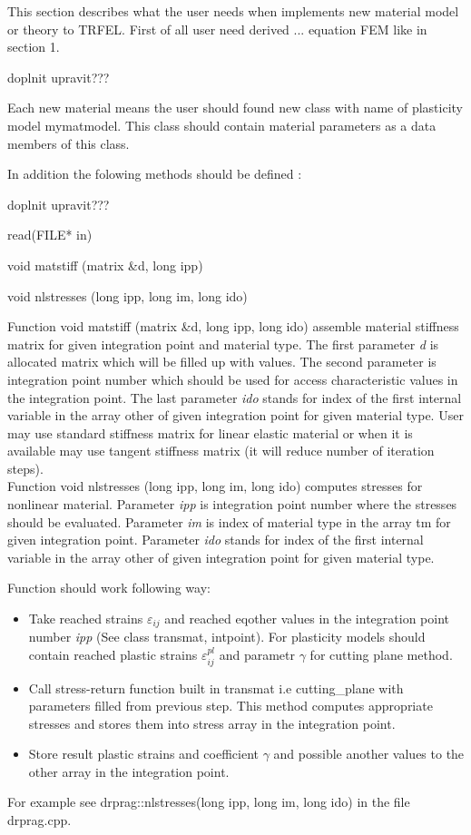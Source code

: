 This section describes what the user needs when implements new material model or theory
to TRFEL. First of all user need derived ... equation FEM like in section 1.

doplnit upravit???


Each new material means the user should found new class with name of plasticity model {\sf mymatmodel}.
This class should contain material parameters as a data members of this class. 

In addition the folowing methods should be defined :

doplnit upravit???

\begin{itemize}
{\sf
\item
read(FILE* in)
\item
void matstiff (matrix \&d, long ipp)
\item
void nlstresses (long ipp, long im, long ido)
}
\end{itemize}

Function {\sf void matstiff (matrix \&d, long ipp, long ido)} assemble material stiffness matrix for given
integration point and material type. The first parameter {\it d} is allocated matrix which will be
filled up with values. The second parameter is integration point number which should be used for
access characteristic values in the integration point. The last parameter {\it ido} stands for index of the first 
internal variable in the array {\sf other} of given integration point for given material type. User may use standard 
stiffness matrix for linear elastic material or when it is available may use tangent stiffness matrix (it will reduce
number of iteration steps).\\

Function {\sf void nlstresses (long ipp, long im, long ido)} computes stresses for nonlinear material. Parameter
{\it ipp} is integration point number where the stresses should be evaluated. Parameter {\it im} is index of material type
in the array {\sf tm} for given integration point. Parameter {\it ido} stands for index of the first 
internal variable in the array {\sf other} of given integration point for given material type.

Function should work following way:
\begin{itemize}
\item
Take reached strains $\varepsilon_{ij}$ and reached {\sf eqother} values in the integration point number
{\it ipp} (See class {\sf transmat, intpoint}). For plasticity models should contain reached plastic
strains $\varepsilon^{pl}_{ij}$ and parametr $\gamma$ for cutting plane method.
\item
Call stress-return function built in {\sf transmat} i.e {\sf cutting\_plane} with parameters filled from
previous step. This method computes appropriate stresses and stores them into stress array in the
integration point.
\item
Store result plastic strains and coefficient $\gamma$ and possible another values to the {\sf other}
array in the integration point. 
\end{itemize}
For example see {\sf drprag::nlstresses(long ipp, long im, long ido)} in the file drprag.cpp.\\

